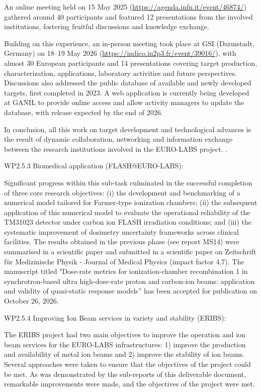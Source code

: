 An online meeting held on 15 May 2025 (\url{https://agenda.infn.it/event/46874/}) gathered around 40 participants and featured 12 presentations from the involved institutions, fostering fruitful discussions and knowledge exchange.

Building on this experience, an in-person meeting took place at GSI (Darmstadt, Germany) on 18–19 May 2026 (\url{https://indico.in2p3.fr/event/39016/}), with almost 30 European participants and 14 presentations covering target production, characterization, applications, laboratory activities and future perspectives. Discussions also addressed the public database of available and newly developed targets, first completed in 2023. A web application is currently being developed at GANIL to provide online access and allow activity managers to update the database, with release expected by the end of 2026.

In conclusion, all this work on target development and technological advances is the result of dynamic collaboration, networking and information exchange between the research institutions involved in the EURO-LABS project.
.



WP2.5.3 Biomedical application (FLASH@EURO-LABS):

Significant progress within this sub-task culminated in the successful completion of three core research objectives: (i) the development and benchmarking of a numerical model tailored for Farmer-type ionization chambers; (ii) the subsequent application of this numerical model to evaluate the operational reliability of the TM31023 detector under carbon ion FLASH irradiation conditions; and (iii) the systematic improvement of dosimetry uncertainty frameworks across clinical facilities. The results obtained in the previous phase (see report MS14) were summarised in a scientific paper and submitted in a scientific paper on  Zeitschrift für Medizinische Physik - Journal of Medical Physics (impact factor 4.7). The manuscript titled "Dose-rate metrics for ionization-chamber recombination 1 in synchrotron-based ultra high-dose-rate proton and carbon-ion beams: application and validity of quasi-static response models” has been accepted for publication on  October 26, 2026.





WP2.5.4 Improving Ion Beam services in variety and stability (ERIBS): 

The ERIBS project had two main objectives to improve the operation and ion beam services for the EURO-LABS infrastructures: 1) improve the production and availability of metal ion beams and 2) improve the stability of ion beams. Several approaches were taken to ensure that the objectives of the project could be met. As was demonstrated by the sub-reports of this deliverable document, remarkable improvements were made, and the objectives of the project were met.

